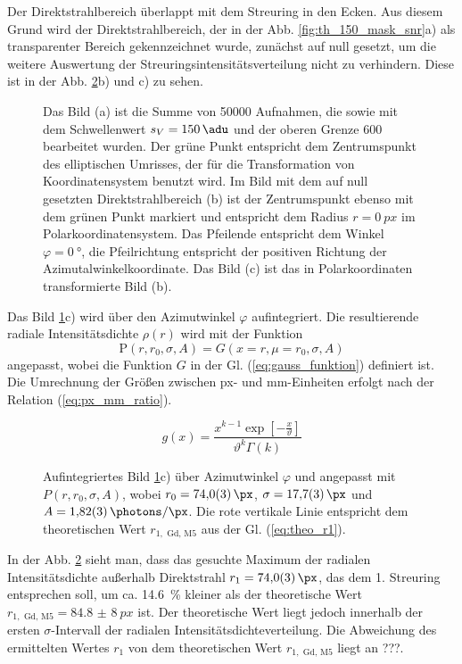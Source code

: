 \noindent
Der Direktstrahlbereich überlappt mit dem Streuring in den Ecken. Aus diesem Grund wird der Direktstrahlbereich, der in der Abb. \ref{fig:th_150_mask_snr}a) als transparenter Bereich gekennzeichnet wurde, zunächst auf null gesetzt, um die weitere Auswertung der Streuringsintensitätsverteilung nicht zu verhindern. Diese ist in der Abb. \ref{fig:radius_fit}b) und c) zu sehen.
\begin{figure}[H]
    \centering
    
    \caption{Das Bild (a) ist die Summe von \num{50000} Aufnahmen, die sowie mit dem Schwellenwert $s_V = \SI{150}{\adu}$ und der oberen Grenze \SI{600}{\adu} bearbeitet wurden. Der grüne Punkt entspricht dem Zentrumspunkt des elliptischen Umrisses, der für die Transformation von Koordinatensystem benutzt wird. Im Bild mit dem auf null gesetzten Direktstrahlbereich (b) ist der Zentrumspunkt ebenso mit dem grünen Punkt markiert und entspricht dem Radius $r=\SI{0}{px}$ im Polarkoordinatensystem. Das Pfeilende entspricht dem Winkel $\varphi = \SI{0}{\degree}$, die Pfeilrichtung entspricht der positiven Richtung der Azimutalwinkelkoordinate. Das Bild (c) ist das in Polarkoordinaten transformierte Bild (b).}
    \label{fig:th-150-200-maske-radial-transform}
\end{figure}
\noindent
Das Bild \ref{fig:th-150-200-maske-radial-transform}c) wird über den Azimutwinkel $\varphi$ aufintegriert. Die resultierende radiale Intensitätsdichte $\rho(r)$ wird mit der Funktion
\begin{equation}
    \mathrm{P}(r, r_0, \sigma, A) = G(x=r,\mu=r_0,\sigma,A)
\end{equation}
angepasst, wobei die Funktion $G$ in der Gl. (\ref{eq:gauss_funktion}) definiert ist. Die Umrechnung der Größen zwischen px- und \si{\milli\meter}-Einheiten erfolgt nach der Relation (\ref{eq:px_mm_ratio}).


\cite{bagschik_employing_2016}
\begin{equation}
    g(x) = \frac{x^{k-1}\exp\left[-\frac{x}{\vartheta}\right]}{\vartheta^k\Gamma(k)}
\end{equation}
\begin{figure}[H]
    \centering
    
    \caption{Aufintegriertes Bild \ref{fig:th-150-200-maske-radial-transform}c) über Azimutwinkel $\varphi$ und angepasst mit $P(r, r_0, \sigma, A)$, wobei $r_0 = \SI{74.0(3)}{\px}$, $\sigma = \SI{17.7(3)}{\px}$ und $A = \SI{1.82(3)}{\photons\per\px}$. Die rote vertikale Linie entspricht dem theoretischen Wert $r_{1, \text{ Gd, M5}}$ aus der Gl. (\ref{eq:theo_r1}).}
    \label{fig:radius_fit}
\end{figure}
\noindent
In der Abb. \ref{fig:radius_fit} sieht man, dass das gesuchte Maximum der radialen Intensitätsdichte außerhalb Direktstrahl $r_1 = \SI{74.0(3)}{\px}$, das dem 1. Streuring entsprechen soll, um ca. \SI{14,6}{\percent} kleiner als der theoretische Wert $r_{1, \text{ Gd, M5}} = \SI{84,8(8)}{px}$ ist. Der theoretische Wert liegt jedoch innerhalb der ersten $\sigma$-Intervall der radialen Intensitätsdichteverteilung. Die Abweichung des ermittelten Wertes $r_1$ von dem theoretischen Wert $r_{1, \text{ Gd, M5}}$ liegt an ???.


